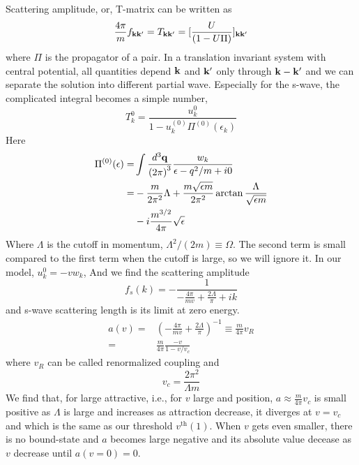 \documentclass[3p,twocolumn]{elsarticle}
\begin{document}
Scattering amplitude, or, T-matrix can be written as 
\begin{equation}
\frac{4\pi}{m}f_{\mathbf{k}\mathbf{k}'}=T_{\mathbf{k}\mathbf{k}'}=[\frac{U}{(1-U\Pi)}]_{\mathbf{k}\mathbf{k}'}
\end{equation}
where $\Pi$ is the propagator of a pair.  In a translation invariant system with central potential, all quantities depend $\mathbf{k}$ and $\mathbf{k}'$ only through $\mathbf{k}-\mathbf{k}'$ and we can separate the solution into different partial wave. Especially for the s-wave, the complicated  integral becomes a simple number,
\begin{equation}
T^{0}_{k}=\frac{u^{0}_{k}}{1-u^{(0)}_{k}\Pi^{(0)}(\epsilon_k)}
\end{equation}
Here 
\begin{equation}
\begin{split}
\Pi^{(0)}(\epsilon)=&\int\frac{d^{3}\mathbf{q}}{{(2\pi)}^{3}}\frac{w_{k}}{\epsilon-q^{2}/m+i0}\\
=&-\frac{m}{2\pi^{2}}{\Lambda}+\frac{m\sqrt{\epsilon{m}}}{2\pi^{2}}\arctan\frac{\Lambda}{\sqrt{\epsilon{m}}}\\
&-i\frac{m^{3/2}}{4\pi}\sqrt{\epsilon}
\end{split}
\end{equation}
Where $\Lambda$ is the cutoff in momentum, $\Lambda^{2}/(2m)\equiv\Omega$. The second term is small compared to the first term when the cutoff is large, so we will ignore it.  In our model, $u^{0}_{k}=-vw_{k}$, And we find the scattering amplitude 
\begin{equation}
f_{s}(k)=-\frac{1}{-\frac{4\pi}{mv}+\frac{2\Lambda}{\pi}+ik}
\end{equation}
and s-wave scattering length is its limit at zero energy. 
\begin{equation}
\begin{split}
a(v)=&\left(-\frac{4\pi}{mv}+\frac{2\Lambda}{\pi}\right)^{-1}\equiv\frac{m}{4\pi}v_{R}\\
     =&\frac{m}{4\pi}\frac{-v}{1-v/v_{c}}
     \end{split}
\end{equation}
where $v_{R}$ can be called renormalized coupling and 
\begin{equation}
v_{c}=\frac{2\pi^{2}}{\Lambda{m}}
\end{equation}
We find that, for large attractive, i.e., for $v$ large and position, $a\approx\frac{m}{4\pi}v_c$ is small positive as $\Lambda$ is large and increases as attraction decrease, it diverges at $v=v_{c}$ and which is the same as our threshold $v^{\text{th}}(1)$.  When $v$ gets even smaller, there is no bound-state and $a$ becomes large negative and its absolute value decease as $v$ decrease until $a(v=0)=0$. 
\end{document}
